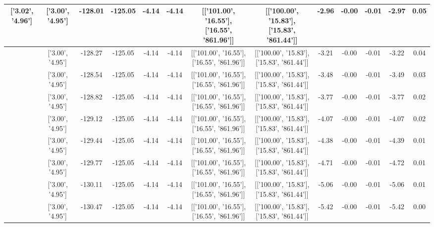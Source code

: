 \begin{table}[htbp]
\begin{adjustbox}{angle=90}
\begin{tabular}{|c|c|c|c|c|c|c|c|c|c|c|c|c|}
 ['3.02', '4.96'] & ['3.00', '4.95'] & -128.01 & -125.05 & -4.14 & -4.14 & [['101.00', '16.55'], ['16.55', '861.96']] & [['100.00', '15.83'], ['15.83', '861.44']] & -2.96 & -0.00 & -0.01 & -2.97 & 0.05\\ \hline
 ['3.02', '4.96'] & ['3.00', '4.95'] & -128.27 & -125.05 & -4.14 & -4.14 & [['101.00', '16.55'], ['16.55', '861.96']] & [['100.00', '15.83'], ['15.83', '861.44']] & -3.21 & -0.00 & -0.01 & -3.22 & 0.04\\ \hline
 ['3.02', '4.96'] & ['3.00', '4.95'] & -128.54 & -125.05 & -4.14 & -4.14 & [['101.00', '16.55'], ['16.55', '861.96']] & [['100.00', '15.83'], ['15.83', '861.44']] & -3.48 & -0.00 & -0.01 & -3.49 & 0.03\\ \hline
 ['3.02', '4.96'] & ['3.00', '4.95'] & -128.82 & -125.05 & -4.14 & -4.14 & [['101.00', '16.55'], ['16.55', '861.96']] & [['100.00', '15.83'], ['15.83', '861.44']] & -3.77 & -0.00 & -0.01 & -3.77 & 0.02\\ \hline
 ['3.02', '4.96'] & ['3.00', '4.95'] & -129.12 & -125.05 & -4.14 & -4.14 & [['101.00', '16.55'], ['16.55', '861.96']] & [['100.00', '15.83'], ['15.83', '861.44']] & -4.07 & -0.00 & -0.01 & -4.07 & 0.02\\ \hline
 ['3.03', '4.96'] & ['3.00', '4.95'] & -129.44 & -125.05 & -4.14 & -4.14 & [['101.00', '16.55'], ['16.55', '861.96']] & [['100.00', '15.83'], ['15.83', '861.44']] & -4.38 & -0.00 & -0.01 & -4.39 & 0.01\\ \hline
 ['3.03', '4.96'] & ['3.00', '4.95'] & -129.77 & -125.05 & -4.14 & -4.14 & [['101.00', '16.55'], ['16.55', '861.96']] & [['100.00', '15.83'], ['15.83', '861.44']] & -4.71 & -0.00 & -0.01 & -4.72 & 0.01\\ \hline
 ['3.03', '4.96'] & ['3.00', '4.95'] & -130.11 & -125.05 & -4.14 & -4.14 & [['101.00', '16.55'], ['16.55', '861.96']] & [['100.00', '15.83'], ['15.83', '861.44']] & -5.06 & -0.00 & -0.01 & -5.06 & 0.01\\ \hline
 ['3.03', '4.96'] & ['3.00', '4.95'] & -130.47 & -125.05 & -4.14 & -4.14 & [['101.00', '16.55'], ['16.55', '861.96']] & [['100.00', '15.83'], ['15.83', '861.44']] & -5.42 & -0.00 & -0.01 & -5.42 & 0.00\\ \hline
            \end{tabular}
        \end{adjustbox}
        \caption{}
        \label{}
    \end{table}
    